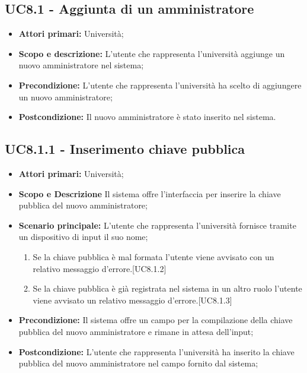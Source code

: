 \documentclass[AnalisiDeiRequisiti.tex]{subfiles}
\begin{document}
\subsection{UC8.1 - Aggiunta di un amministratore}
\begin{itemize}
	\item \textbf{Attori primari:} Università;\\
	\item \textbf{Scopo e descrizione:} L'utente che rappresenta l'università aggiunge un nuovo amministratore nel sistema;
	\item \textbf{Precondizione:} L'utente che rappresenta l'università ha scelto di aggiungere un nuovo amministratore; 
	\item \textbf{Postcondizione:} Il nuovo amministratore è stato inserito nel sistema.
\end{itemize}
\subsection{UC8.1.1 - Inserimento chiave pubblica}
\begin{itemize}
	\item \textbf{Attori primari:} Università;\\
	\item \textbf{Scopo e Descrizione} Il sistema offre l'interfaccia per inserire la chiave pubblica del nuovo amministratore;
	\item \textbf{Scenario principale:} L'utente che rappresenta l'università fornisce tramite un dispositivo di input il suo nome;	\begin{enumerate}
		\item Se la chiave pubblica è mal formata l'utente viene avvisato con un relativo messaggio d'errore.[UC8.1.2]
		\item Se la chiave pubblica è già registrata nel sistema in un altro ruolo l'utente viene avvisato un relativo messaggio d'errore.[UC8.1.3]
	\end{enumerate}
	\item \textbf{Precondizione:} Il sistema offre un campo per la compilazione della chiave pubblica del nuovo amministratore e rimane in attesa dell'input;
	\item \textbf{Postcondizione:} L'utente che rappresenta l'università ha inserito la chiave pubblica del nuovo amministratore nel campo fornito dal sistema;
\end{itemize}
\end{document}
